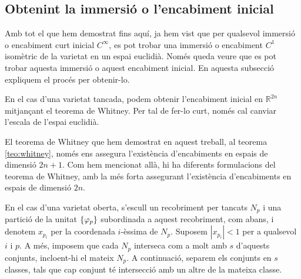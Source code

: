 \subsection{Obtenint la immersió o l'encabiment inicial}\label{sec:encabiment_inicial}
Amb tot el que hem demostrat fins aquí, ja hem vist que per qualsevol immersió o encabiment curt inicial $C^\infty$, es pot trobar una immersió o encabiment $C^1$ isomètric de la varietat en un espai euclidià. Només queda veure que es pot trobar aquesta immersió o aquest encabiment inicial. En aquesta subsecció expliquem el procés per obtenir-lo. 

En el cas d'una varietat tancada, podem obtenir l'encabiment inicial en $\mathbb R^{2n}$ mitjançant el teorema de Whitney. Per tal de fer-lo curt, només cal canviar l'escala de l'espai euclidià.
\begin{obs}
    El teorema de Whitney que hem demostrat en aquest treball, al teorema \ref{teo:whitney}, només ens assegura l'existència d'encabiments en espais de dimensió $2n+1$. Com hem mencionat allà, hi ha diferents formulacions del teorema de Whitney, amb la més forta assegurant l'existència d'encabiments en espais de dimensió $2n$.
\end{obs}

En el cas d'una varietat oberta, s'escull un recobriment per tancats $N_p$ i una partició de la unitat $\{\varphi_p\}$ subordinada a aquest recobriment, com abans, i denotem $x_{p_i}$ per la coordenada $i$-èssima de $N_p$. Suposem $|x_{p_i}|<1$ per a qualsevol $i$ i $p$. A més, imposem que cada $N_p$ interseca com a molt amb $s$ d'aquests conjunts, incloent-hi el mateix $N_p$. A continuació, separem els conjunts en $s$ classes, tals que cap conjunt té intersecció amb un altre de la mateixa classe. 

